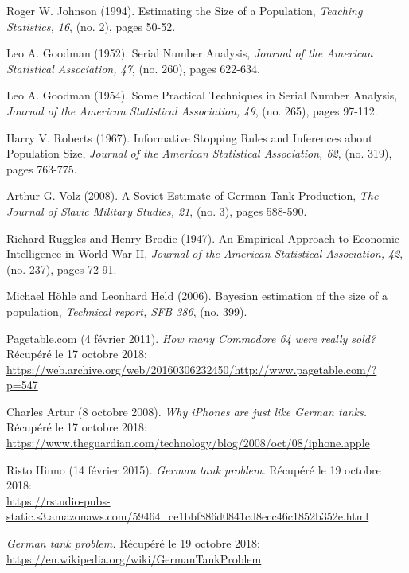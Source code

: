 \bigskip


\begin{thebibliography}{10}

 Roger W. Johnson (1994). Estimating the Size of a Population, {\em Teaching Statistics, 16}, (no. 2), pages 50-52.

 Leo A. Goodman (1952). Serial Number Analysis, {\em Journal of the American Statistical Association, 47}, (no. 260), pages 622-634.

 Leo A. Goodman (1954). Some Practical Techniques in Serial Number Analysis, {\em Journal of the American Statistical Association, 49}, (no. 265), pages 97-112.

 Harry V. Roberts (1967). Informative Stopping Rules and Inferences about Population Size, {\em Journal of the American Statistical Association, 62}, (no. 319), pages 763-775.

 Arthur G. Volz (2008). A Soviet Estimate of German Tank Production, {\em The Journal of Slavic Military Studies, 21}, (no. 3), pages 588-590.

 Richard Ruggles and Henry Brodie (1947). An Empirical Approach to Economic Intelligence in World War II, {\em Journal of the American Statistical Association, 42}, (no. 237), pages 72-91.

 Michael Höhle and Leonhard Held (2006). Bayesian estimation of the size of a population, {\em Technical report, SFB 386}, (no. 399).

 Pagetable.com (4 février 2011). {\em How many Commodore 64 were really sold?} Récupéré le 17 octobre 2018:\\  \href{https://web.archive.org/web/20160306232450/http://www.pagetable.com/?p=547}{https://web.archive.org/web/20160306232450/http://www.pagetable.com/?p=547}

 Charles Artur (8 octobre 2008). {\em Why iPhones are just like German tanks.} Récupéré le 17 octobre 2018:\\ \href{https://www.theguardian.com/technology/blog/2008/oct/08/iphone.apple}{https://www.theguardian.com/technology/blog/2008/oct/08/iphone.apple}

 Risto Hinno (14 février 2015). {\em German tank problem.} Récupéré le 19 octobre 2018:\\  \href{https://rstudio-pubs-static.s3.amazonaws.com/59464\_ce1bbf886d0841cd8ecc46c1852b352e.html}{https://rstudio-pubs-static.s3.amazonaws.com/59464\_ce1bbf886d0841cd8ecc46c1852b352e.html}

 {\em German tank problem.} Récupéré le 19 octobre 2018:\\  \href{https://en.wikipedia.org/wiki/German_tank_problem}{https://en.wikipedia.org/wiki/GermanTankProblem}

\end{thebibliography}

